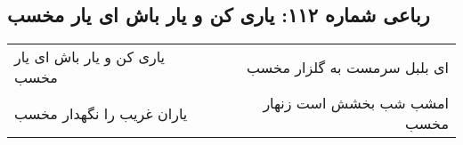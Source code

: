 \begin{center}
\section*{رباعی شماره ۱۱۲: یاری کن و یار باش ای یار مخسب}
\label{sec:0112}
\begin{longtable}{l p{0.5cm} r}
یاری کن و یار باش ای یار مخسب
&&
ای بلبل سرمست به گلزار مخسب
\\
یاران غریب را نگهدار مخسب
&&
امشب شب بخشش است زنهار مخسب
\\
\end{longtable}
\end{center}
